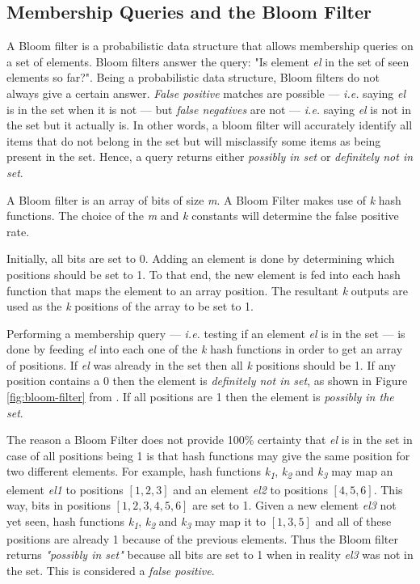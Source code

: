 \subsection{Membership Queries and the Bloom Filter}
A Bloom filter \cite{BLOOM-BLOOMFILTER} is a probabilistic data structure that allows membership queries on a set of elements. Bloom filters answer the query: "Is element \textit{el} in the set of seen elements so far?". Being a probabilistic data structure, Bloom filters do not always give a certain answer. \textit{False positive} matches are possible --- \textit{i.e.} saying \textit{el} is in the set when it is not --- but \textit{false negatives} are not --- \textit{i.e.} saying \textit{el} is not in the set but it actually is. In other words, a bloom filter will accurately identify all items that do not belong in the set but will misclassify some items as being present in the set. Hence, a query returns either \textit{possibly in set} or \textit{definitely not in set}. 

A Bloom filter is an array of bits of size \textit{m}. A Bloom Filter makes use of \textit{k} hash functions. The choice of the \textit{m} and \textit{k} constants will determine the false positive rate. 

Initially, all bits are set to 0. Adding an element is done by determining which positions should be set to 1. To that end, the new element is fed into each hash function that maps the element to an array position. The resultant \textit{k} outputs are used as the \textit{k} positions of the array to be set to 1.

Performing a membership query --- \textit{i.e.} testing if an element \textit{el} is in the set --- is done by feeding \textit{el} into each one of the \textit{k} hash functions in order to get an array of positions. If \textit{el} was already in the set then all \textit{k} positions should be 1. If any position contains a 0 then the element is \textit{definitely not in set}, as shown in Figure \ref{fig:bloom-filter} from \cite{bloom-filter-wikipedia}. If all positions are 1 then the element is \textit{possibly in the set}. 

The reason a Bloom Filter does not provide 100\% certainty that \textit{el} is in the set in case of all positions being 1 is that hash functions may give the same position for two different elements. For example, hash functions \textit{k\textsubscript{1}}, \textit{k\textsubscript{2}} and \textit{k\textsubscript{3}} may map an element \textit{el1} to positions $[1,2,3]$ and an element \textit{el2} to positions $[4,5,6]$. This way, bits in positions $[1,2,3,4,5,6]$ are set to 1. Given a new element \textit{el3} not yet seen, hash functions \textit{k\textsubscript{1}}, \textit{k\textsubscript{2}} and \textit{k\textsubscript{3}} may map it to $[1,3,5]$ and all of these positions are already 1 because of the previous elements. Thus the Bloom filter returns \textit{"possibly in set"} because all bits are set to 1 when in reality \textit{el3} was not in the set. This is considered a \textit{false positive}.


